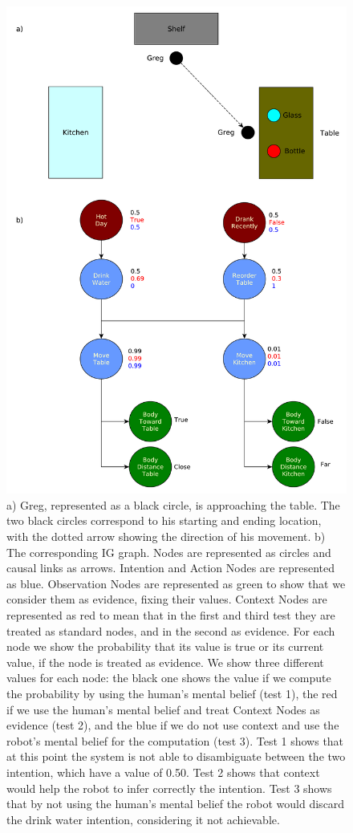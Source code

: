  \begin{figure}[ht!]
	\centering
	\includegraphics[scale=0.4]{img/observer/ig_exp1.pdf}
	\caption[IG Example 1]{a) Greg, represented as a black circle, is approaching the table. The two black circles correspond to his starting and ending location, with the dotted arrow showing the direction of his movement. b) The corresponding IG graph. Nodes are represented as circles and causal links as arrows. Intention and Action Nodes are represented as blue. Observation Nodes are represented as green to show that we consider them as evidence, fixing their values. Context Nodes are represented as red to mean that in the first and third test they are treated as standard nodes, and in the second as evidence.
 	 For each node we show the probability that its value is true or its current value, if the node is treated as evidence. We show three different values for each node: the black one shows the value if we compute the probability by using the human's mental belief (test 1), the red if we use the human's mental belief and treat Context Nodes as evidence (test 2), and the blue if we do not use context and use the robot's mental belief for the computation (test 3). Test 1 shows that at this point the system is not able to disambiguate between the two intention, which have a value of 0.50. Test 2 shows that context would help the robot to infer correctly the intention. Test 3 shows that by not using the human's mental belief the robot would discard the drink water intention, considering it not achievable.}
	\label{fig:intention-ig_exp1}
\end{figure}

